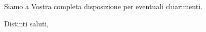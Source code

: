 \documentclass[12pt]{letter} %
\begin{document}
\begin{letter}
\begin{addmargin}[2em]{2em}
		\par Siamo a Vostra completa disposizione per eventuali chiarimenti.
	\end{addmargin}

	\closing{Distinti saluti,}




	\end{letter}
\end{document}
